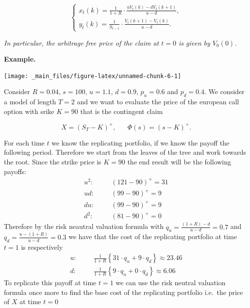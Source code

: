 \documentclass[
]{book}
\begin{document}
\[
\left\{\begin{matrix}x_t(k)=\frac{1}{1+R}\cdot\frac{uV_t(k)-dV_t(k+1)}{u-d},\\ y_t(k)=\frac{1}{S_{t-1}}\cdot\frac{V_t(k+1)-V_t(k)}{u-d}.\end{matrix}\right.
\]

\emph{In particular, the arbitrage free price of the claim at \(t=0\) is given by \(V_0(0)\).}

\textbf{Example.}

\begin{center}\texttt{[image: \_main\_files/figure-latex/unnamed-chunk-6-1]} \end{center}

Consider \(R=0.04\), \(s=100\), \(u=1.1\), \(d=0.9\), \(p_u=0.6\) and \(p_d=0.4\). We consider a model of length \(T=2\) and we want to evaluate the price of the european call option with srike \(K=90\) that is the contingent claim

\[
X=(S_T-K)^+,\hspace{20pt}\Phi(s)=(s-K)^+.
\]

For each time \(t\) we know the replicating portfolio, if we know the payoff the following period. Therefore we start from the leaves of the tree and work towards the root. Since the strike price is \(K=90\) the end result will be the following payoffs:
\begin{align*}
u^2:\hspace{20pt}&(121-90)^+=31\\
ud:\hspace{20pt}&(99-90)^+=9\\
du:\hspace{20pt}&(99-90)^+=9\\
d^2:\hspace{20pt}&(81-90)^+=0
\end{align*}
Therefore by the risk neautral valuation formula with \(q_u=\frac{(1+R)-d}{u-d}=0.7\) and \(q_d=\frac{u-(1+R)}{u-d}=0.3\) we have that the cost of the replicating portfolio at time \(t=1\) is respectively
\begin{align*}
u:\hspace{20pt}&\frac{1}{1+R}\left\{31\cdot q_u + 9 \cdot q_d\right\}\approx 23.46\\
d:\hspace{20pt}&\frac{1}{1+R}\left\{9\cdot q_u + 0 \cdot q_d\right\}\approx 6.06
\end{align*}
To replicate this payoff at time \(t=1\) we can use the risk neutral valuation formula once more to find the base cost of the replicating portfolio i.e.~the price of \(X\) at time \(t=0\)
\end{document}
